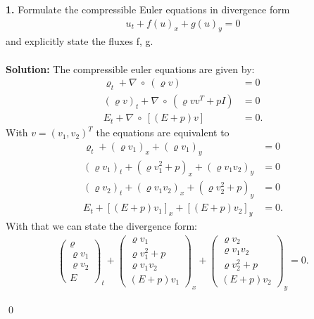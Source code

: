 \documentclass[11pt]{scrartcl}
\begin{document}
\textbf{1.} Formulate the compressible Euler equations in divergence form 
\begin{align*}
	u_t+f(u)_x + g(u)_y =0 
\end{align*}
and explicitly state the fluxes f, g.
\\
\\
\textbf{Solution:} 
The compressible euler equations are given by:
\begin{align*}
	\varrho_t+ \nabla \  \circ \ (\varrho v)&=0\\
	(\varrho v)_t+ \nabla \  \circ \ (\varrho vv^T + pI)&=0\\
	E_t + \nabla \ \circ \ [(E+p)v]&=0.
\end{align*}
With $v=(v_1,v_2)^T$ the equations are equivalent to
\begin{align*}
	\varrho_t+ (\varrho v_1)_x + (\varrho v_1)_y  &=0\\
	(\varrho v_1)_t+ (\varrho v_1^2 + p)_x + (\varrho v_1 v_2)_y &=0\\
	(\varrho v_2)_t+ (\varrho v_1 v_2 )_x + (\varrho v_2^2 + p)_y &=0\\
	E_t + [(E+p)v_1]_x + [(E+p)v_2]_y&=0.
\end{align*}
With that we can state the divergence form:
\begin{align*}
	\left(\begin{array}{c} \varrho \\ \varrho v_1 \\ \varrho v_2 \\ E \end{array}\right)_t	+  \left(\begin{array}{c} \varrho v_1 \\ \varrho v_1^2 + p \\ \varrho v_1 v_2 \\ (E+p)v_1 \end{array}\right)_x +  \left(\begin{array}{c} \varrho v_2 \\ \varrho v_1 v_2 \\ \varrho v_2^2+p \\ (E+p)v_2 \end{array}\right)_y = 0.
\end{align*}

\qed
\newline
\noindent 
\end{document}
